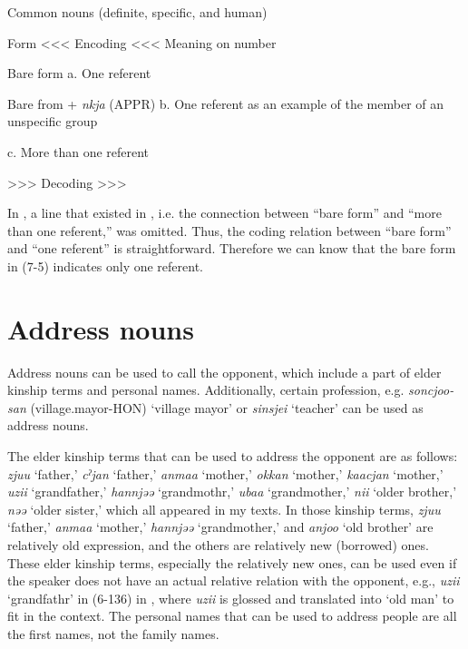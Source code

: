 \begin{styleBeschriftung}
\textmd{}\textmd{ Common nouns (definite, specific, and human)}
\end{styleBeschriftung}

Form  <<< Encoding <<<  Meaning on number

Bare form  %
  a.  One referent

Bare from + \textit{nkja} (APPR)  %
  b.  One referent as an example of the member of an unspecific group

    c.  More than one referent

  >>> Decoding >>>  

In , a line that existed in , i.e. the connection between “bare form” and “more than one referent,” was omitted. Thus, the coding relation between “bare form” and “one referent” is straightforward. Therefore we can know that the bare form in (7-5) indicates only one referent.

\section{Address nouns}

Address nouns can be used to call the opponent, which include a part of elder kinship terms and personal names. Additionally, certain profession, e.g. \textit{soncjoo-san} (village.mayor-HON) ‘village mayor’ or \textit{sinsjei} ‘teacher’ can be used as address nouns.

The elder kinship terms that can be used to address the opponent are as follows: \textit{zjuu} ‘father,’ \textit{cˀjan} ‘father,’ \textit{anmaa} ‘mother,’ \textit{okkan} ‘mother,’ \textit{kaacjan} ‘mother,’ \textit{uzii} ‘grandfather,’ \textit{hannjəə} ‘grandmothr,’ \textit{ubaa} ‘grandmother,’ \textit{nii} ‘older brother,’ \textit{nəə} ‘older sister,’ which all appeared in my texts. In those kinship terms, \textit{zjuu} ‘father,’ \textit{anmaa} ‘mother,’ \textit{hannjəə} ‘grandmother,’ and \textit{anjoo} ‘old brother’ are relatively old expression, and the others are relatively new (borrowed) ones. These elder kinship terms, especially the relatively new ones, can be used even if the speaker does not have an actual relative relation with the opponent, e.g., \textit{uzii} ‘grandfathr’ in (6-136) in , where \textit{uzii} is glossed and translated into ‘old man’ to fit in the context. The personal names that can be used to address people are all the first names, not the family names.

